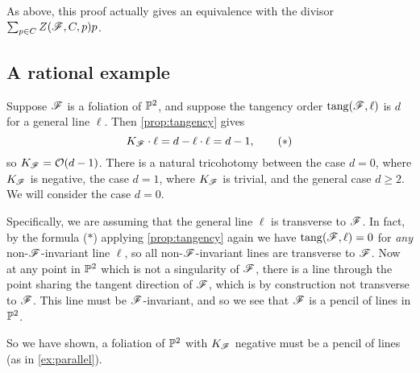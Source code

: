 \begin{remark}
    As above, this proof actually gives an equivalence with the divisor
    $\sum_{p\in C}Z(\scrF,C,p)p$.
\end{remark}

\subsection{A rational example}\label{sec:pencil}

Suppose $\scrF$ is a foliation of $\P^2$, and suppose the tangency order
$\tang(\scrF,\ell)$ is $d$ for a general line $\ell$. Then \cref{prop:tangency}
gives
\begin{equation*}
    K_\scrF\cdot\ell = d - \ell\cdot\ell = d - 1, \tag{$*$}
\end{equation*}
so $K_\scrF=\O(d-1)$. There is a natural tricohotomy between the case $d=0$,
where $K_\scrF$ is negative, the case $d=1$, where $K_\scrF$ is trivial, and the
general case $d\ge2$. We will consider the case $d=0$.

Specifically, we are assuming that the general line $\ell$ is transverse to
$\scrF$. In fact, by the formula ($*$) applying \cref{prop:tangency} again we
have $\tang(\scrF,\ell)=0$ for \emph{any} non-$\scrF$-invariant line $\ell$, so
all non-$\scrF$-invariant lines are transverse to $\scrF$. Now at any point in
$\P^2$ which is not a singularity of $\scrF$, there is a line through the point
sharing the tangent direction of $\scrF$, which is by construction not
transverse to $\scrF$. This line must be $\scrF$-invariant, and so we see that
$\scrF$ is a pencil of lines in $\P^2$.

So we have shown, a foliation of $\P^2$ with $K_\scrF$ negative must be a pencil
of lines (as in \cref{ex:parallel}).
